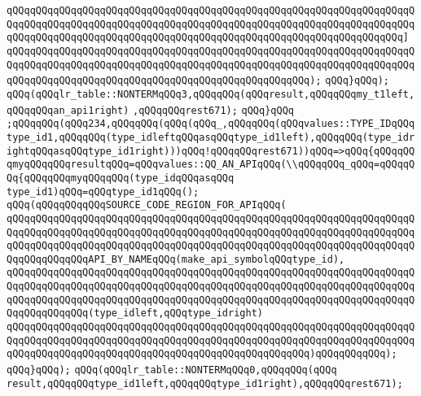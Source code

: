 \verb|qQQqqQQqqQQqqQQqqQQqqQQqqQQqqQQqqQQqqQQqqQQqqQQqqQQqqQQqqQQqqQQqqQQqqQQqqQQqqQQqqQQqqQQqqQQqqQQqqQQqqQQqqQQqqQQqqQQqqQQqqQQqqQQqqQQqqQQqqQQqqQQqqQQqqQQqqQQqqQQqqQQqqQQqqQQqqQQqqQQqqQQqqQQqqQQqqQQqqQQqqQQqqQQq]|\newline
\verb|qQQqqQQqqQQqqQQqqQQqqQQqqQQqqQQqqQQqqQQqqQQqqQQqqQQqqQQqqQQqqQQqqQQqqQQqqQQqqQQqqQQqqQQqqQQqqQQqqQQqqQQqqQQqqQQqqQQqqQQqqQQqqQQqqQQqqQQqqQQqqQQqqQQqqQQqqQQqqQQqqQQqqQQqqQQqqQQqqQQqqQQqqQQqqQQq);|\newline
\verb|qQQq}qQQq);|\newline
\verb|qQQq(qQQqlr_table::NONTERMqQQq3,qQQqqQQq(qQQqresult,qQQqqQQqmy_t1left,qQQqqQQqan_api1right)|\newline
\verb|,qQQqqQQqrest671);|\newline
\verb|qQQq}qQQq|\newline
\verb|;qQQqqQQq(qQQq234,qQQqqQQq(qQQq(qQQq_,qQQqqQQq(qQQqvalues::TYPE_IDqQQqtype_id1,qQQqqQQq(type_idleftqQQqasqQQqtype_id1left),qQQqqQQq(type_idrightqQQqasqQQqtype_id1right)))qQQq!qQQqqQQqrest671))qQQq=>qQQq{qQQqqQQqmyqQQqqQQqresultqQQq=qQQqvalues::QQ_AN_APIqQQq(\\qQQqqQQq_qQQq=qQQqqQQq{qQQqqQQqmyqQQqqQQq(type_idqQQqasqQQq|\newline
\verb|type_id1)qQQq=qQQqtype_id1qQQq();|\newline
\verb|qQQq(qQQqqQQqqQQqSOURCE_CODE_REGION_FOR_APIqQQq(|\newline
\verb|qQQqqQQqqQQqqQQqqQQqqQQqqQQqqQQqqQQqqQQqqQQqqQQqqQQqqQQqqQQqqQQqqQQqqQQqqQQqqQQqqQQqqQQqqQQqqQQqqQQqqQQqqQQqqQQqqQQqqQQqqQQqqQQqqQQqqQQqqQQqqQQqqQQqqQQqqQQqqQQqqQQqqQQqqQQqqQQqqQQqqQQqqQQqqQQqqQQqqQQqqQQqqQQqqQQqqQQqqQQqqQQqAPI_BY_NAMEqQQq(make_api_symbolqQQqtype_id),|\newline
\verb|qQQqqQQqqQQqqQQqqQQqqQQqqQQqqQQqqQQqqQQqqQQqqQQqqQQqqQQqqQQqqQQqqQQqqQQqqQQqqQQqqQQqqQQqqQQqqQQqqQQqqQQqqQQqqQQqqQQqqQQqqQQqqQQqqQQqqQQqqQQqqQQqqQQqqQQqqQQqqQQqqQQqqQQqqQQqqQQqqQQqqQQqqQQqqQQqqQQqqQQqqQQqqQQqqQQqqQQqqQQqqQQq(type_idleft,qQQqtype_idright)|\newline
\verb|qQQqqQQqqQQqqQQqqQQqqQQqqQQqqQQqqQQqqQQqqQQqqQQqqQQqqQQqqQQqqQQqqQQqqQQqqQQqqQQqqQQqqQQqqQQqqQQqqQQqqQQqqQQqqQQqqQQqqQQqqQQqqQQqqQQqqQQqqQQqqQQqqQQqqQQqqQQqqQQqqQQqqQQqqQQqqQQqqQQqqQQqqQQqqQQq)qQQqqQQqqQQq);|\newline
\verb|qQQq}qQQq);|\newline
\verb|qQQq(qQQqlr_table::NONTERMqQQq0,qQQqqQQq(qQQq|\newline
\verb|result,qQQqqQQqtype_id1left,qQQqqQQqtype_id1right),qQQqqQQqrest671);|\newline
